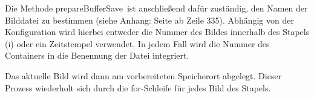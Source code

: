 Die Methode \glqq prepareBufferSave\grqq\ ist anschließend dafür zuständig, den Namen der Bilddatei zu bestimmen (siehe Anhang: Seite \pageref{prepareBufferSave} ab Zeile 335). Abhängig von der Konfiguration wird hierbei entweder die Nummer des 
Bildes innerhalb des Stapels (\glqq i\grqq) oder ein Zeitstempel verwendet. In jedem Fall wird die Nummer des Containers in die Benennung der Datei integriert.

Das aktuelle Bild wird dann am vorbereiteten Speicherort abgelegt. Dieser Prozess wiederholt sich durch die for-Schleife für jedes Bild des Stapels.